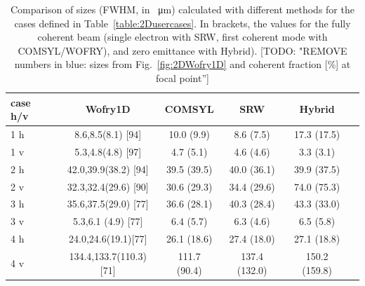 \documentclass{iucr}              %
\newcommand{\todo}[1]{{\color{red}[TODO: "#1'']}}
\newcommand{\inblue}[1]{{\color{blue}#1}}
\begin{document}
\begin{table}[]
    \label{table:comparison}
    \caption{Comparison of sizes (FWHM, in \SI{}{\micro\meter}) calculated with different methods for the cases defined in Table~\ref{table:2Dusercases}.
    In brackets, the values for the fully coherent beam (single electron with SRW, first coherent mode with COMSYL/WOFRY), and zero emittance with Hybrid).
    \todo{REMOVE numbers \inblue{in blue}: sizes from Fig.~\ref{fig:2DWofry1D} and coherent fraction [\%] at focal point}
    }
    \centering
    \begin{tabular}{p{}|c|c|c|c|c}
         case h/v &
         Wofry1D&
         COMSYL&
         SRW&
         Hybrid \\
         \hline
1 h  & \inblue{8.6,}8.5(8.1) \inblue{[94]}  & 10.0 (9.9)  & 8.6 (7.5)   & 17.3 (17.5) \\
1 v  & \inblue{5.3,}4.8(4.8) \inblue{[97]}   & 4.7 (5.1)   & 4.6 (4.6)   & 3.3 (3.1) \\
\hline
2 h  & \inblue{42.0,}39.9(38.2) \inblue{[94]} & 39.5 (39.5) & 40.0 (36.1)  & 39.9 (37.5) \\
2 v  & \inblue{32.3,}32.4(29.6) \inblue{[90]} & 30.6 (29.3) & 34.4 (29.6)  & 74.0 (75.3) \\
\hline
3 h  & \inblue{35.6,}37.5(29.0) \inblue{[77]} & 36.6 (28.1) & 40.3 (28.4)  & 43.3 (33.0) \\
3 v  & \inblue{5.3,}6.1 (4.9)  \inblue{[77]} & 6.4 (5.7) & 6.3 (4.6)   & 6.5 (5.8) \\
\hline
4 h  & \inblue{24.0,}24.6(19.1)\inblue{[77]}  & 26.1 (18.6) & 27.4 (18.0)  & 27.1 (18.8) \\
4 v  & \inblue{134.4,}133.7(110.3)\inblue{[71]}& 111.7 (90.4) & 137.4 (132.0) & 150.2 (159.8) \\
    \end{tabular}
\end{table}
\end{document}
